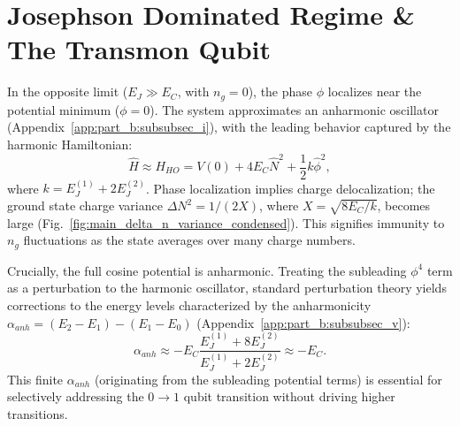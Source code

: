 \documentclass[12pt]{article}
\begin{document}
\section{Josephson Dominated Regime \& The Transmon Qubit}
In the opposite limit ($E_J \gg E_C$, with $n_g=0$), the phase $\phi$ localizes near the potential minimum ($\phi=0$). The system approximates an anharmonic oscillator (Appendix~\ref{app:part_b:subsubsec_i}), with the leading behavior captured by the harmonic Hamiltonian:
\begin{equation}
 \hat{H} \approx H_{HO} = V(0) + 4 E_C \hat{N}^2 + \frac{1}{2} k \hat{\phi}^2 ,
 \label{eq:main_H_HO_condensed}
\end{equation}
where $k = E_J^{(1)} + 2 E_J^{(2)}$. Phase localization implies charge delocalization; the ground state charge variance $\Delta N^2 = 1/(2X)$, where $X = \sqrt{8 E_C / k}$, becomes large (Fig.~\ref{fig:main_delta_n_variance_condensed}). This signifies immunity to $n_g$ fluctuations as the state averages over many charge numbers. 

Crucially, the full cosine potential is anharmonic. Treating the subleading $\phi^4$ term as a perturbation to the harmonic oscillator, standard perturbation theory yields corrections to the energy levels characterized by the anharmonicity $\alpha_{anh} = (E_2 - E_1) - (E_1 - E_0)$ (Appendix~\ref{app:part_b:subsubsec_v}): %
\begin{equation}
 \alpha_{anh} \approx - E_C \frac{E_J^{(1)} + 8 E_J^{(2)}}{E_J^{(1)} + 2 E_J^{(2)}} \approx -E_C .
 \label{eq:main_anharm_condensed}
\end{equation}
This finite $\alpha_{anh}$ (originating from the subleading potential terms) is essential for selectively addressing the $0 \to 1$ qubit transition without driving higher transitions. 
\end{document}
